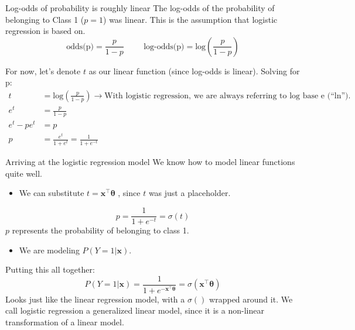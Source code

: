 \documentclass[aspectratio=169]{../latex_main/tntbeamer}  %
\begin{document}
	
	\begin{frame}{Log-odds of probability is roughly linear}
	    The log-odds of the probability of belonging to Class 1 ($p = 1$) was linear. This is the assumption that logistic regression is based on. \\
	    \begin{equation*}
	        \text{odds(p)} = \frac{p}{1 - p}\hspace{1cm} \text{log-odds(p)} = \text{log}\left(\frac{p}{1 - p}\right)
	    \end{equation*}
	    
	    For now, let’s denote $t$ as our linear function (since log-odds is linear). Solving for p:
	    \begin{align*}
	        t &= \text{log}\left(\frac{p}{1 - p}\right)\rightarrow \text{With logistic regression, we are always referring to log base e (“ln”).
} \\
	        e^t &= \frac{p}{1 - p}\\
	        e^t - pe^t &= p\\
	        p &= \frac{e^t}{1 + e^t} = \frac{1}{1 + e^{-t}}
	    \end{align*}
	\end{frame}
		
	
	\begin{frame}{Arriving at the logistic regression model}
	    We know how to model linear functions quite well.\\
	    \begin{itemize}
	        \item We can substitute          $t = \bm{x}^\intercal\bm{\theta} $           , since $t$ was just a placeholder.
	    \end{itemize}
	    \begin{equation*}
	        p = \frac{1}{1 + e^{-t}} = \sigma (t)
	    \end{equation*}
	    $p$ represents the probability of belonging to class 1.
	    \begin{itemize}
	        \item We are modeling          $P(Y=1|\bm{x})$.
	    \end{itemize}
	    Putting this all together:
	    \begin{equation*}
	        P(Y=1|\bm{x}) = \frac{1}{1 + e^{-\bm{x}^\intercal\bm{\theta}}} = \sigma(\bm{x}^\intercal\bm{\theta})
	    \end{equation*}
	    Looks just like the linear regression model, with a $\sigma()$ wrapped around it.
We call logistic regression a generalized linear model, since it is a non-linear transformation of a linear model.

	\end{frame}
	
\end{document}
